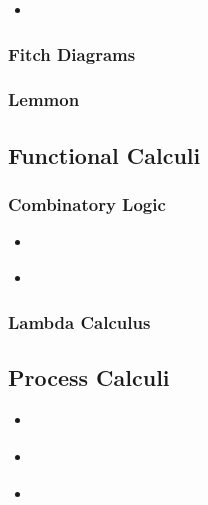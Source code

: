 \begin{itemize}

\item {} \cite{Smullyan1968-SMUFL}

\end{itemize}

\subsubsection{Fitch Diagrams}

 \cite{Fitch1952-FITSL}

\subsubsection{Lemmon}

 \cite{Lemmon1965-LEMBL}

\subsection{Functional Calculi}

\subsubsection{Combinatory Logic}

\begin{itemize}
\item {} \cite{bimbo2011combinatory}
\item {} \cite{Smullyan1985-SMUTMA-2}
\end{itemize}

\subsubsection{Lambda Calculus}

\subsection{Process Calculi}

\begin{itemize}
\item {} \cite{sangiorgi2003pi}
\item {} \cite{milner1999communicating}
\item {} \cite{Honda00secureinformation}
\end{itemize}


